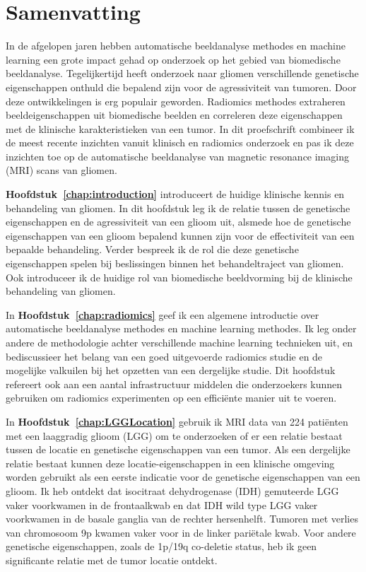 \chapter{Samenvatting}
\begin{ChapterAbstractNoTitle}
\end{ChapterAbstractNoTitle}

In de afgelopen jaren hebben automatische beeldanalyse methodes en machine learning een grote impact gehad op onderzoek op het gebied van biomedische beeld\-analyse.
Tegelijkertijd heeft onderzoek naar gliomen verschillende genetische eigenschappen onthuld die bepalend zijn voor de agressiviteit van tumoren.
Door deze ontwikkelingen is  erg populair geworden.
Radiomics methodes extraheren beeldeigenschappen uit biomedische beelden en correleren deze eigenschappen met de klinische karakteristieken van een tumor.
In dit proefschrift combineer ik de meest recente inzichten vanuit klinisch en radiomics onderzoek en pas ik deze inzichten toe op de automatische beeldanalyse van magnetic resonance imaging (MRI) scans van gliomen.


\textbf{Hoofdstuk~\ref{chap:introduction}} introduceert de huidige klinische kennis en behandeling van gliomen.
In dit hoofdstuk leg ik de relatie tussen de genetische eigenschappen en de agressiviteit van een glioom uit, alsmede hoe de genetische eigenschappen van een glioom bepalend kunnen zijn voor de effectiviteit van een bepaalde behandeling.
Verder bespreek ik de rol die deze genetische eigenschappen spelen bij beslissingen binnen het behandeltraject van gliomen.
Ook introduceer ik de huidige rol van biomedische beeldvorming bij de klinische behandeling van gliomen.

In \textbf{Hoofdstuk~\ref{chap:radiomics}} geef ik een algemene introductie over automatische beeldanalyse methodes en machine learning methodes.
Ik leg onder andere de methodologie achter verschillende machine learning technieken uit, en bediscussieer het belang van een goed uitgevoerde radiomics studie en de mogelijke valkuilen bij het opzetten van een dergelijke studie.
Dit hoofdstuk refereert ook aan een aantal infrastructuur middelen die onderzoekers kunnen gebruiken om radiomics experimenten op een effici{\"e}nte manier uit te voeren.

In \textbf{Hoofdstuk~\ref{chap:LGGLocation}} gebruik ik MRI data van 224 pati{\"e}nten met een  laaggradig glioom (LGG) om te onderzoeken of er een relatie bestaat tussen de locatie en genetische eigenschappen van een tumor.
Als een dergelijke relatie bestaat kunnen deze locatie-eigenschappen in een klinische omgeving worden gebruikt als een eerste indicatie voor de genetische eigenschappen van een glioom.
Ik heb ontdekt dat isocitraat dehydrogenase (IDH) gemuteerde LGG vaker voorkwamen in de frontaalkwab en dat IDH wild type LGG vaker voorkwamen in de basale ganglia van de rechter hersenhelft.
Tumoren met verlies van chromosoom 9p kwamen vaker voor in de linker pari{\"e}tale kwab.
Voor andere genetische eigenschappen, zoals de 1p/19q co-deletie status, heb ik geen significante relatie met de tumor locatie ontdekt.

